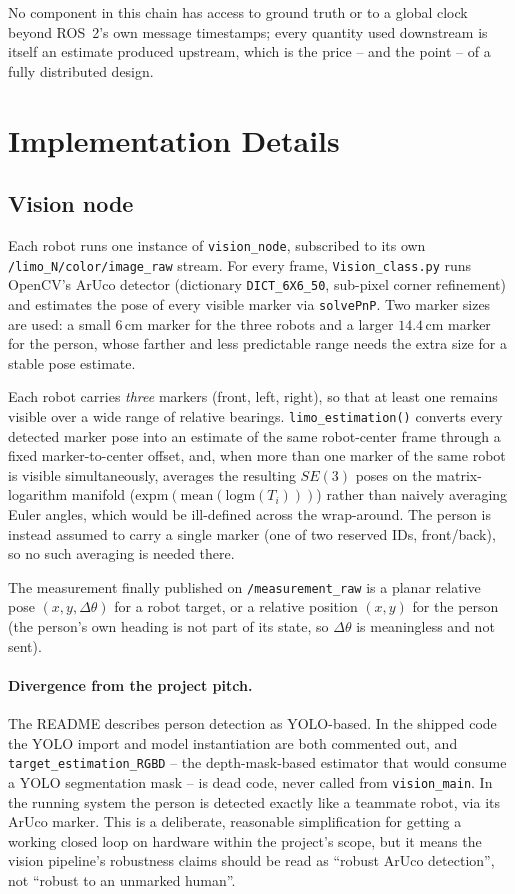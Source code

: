 \documentclass[10pt,conference]{IEEEtran}
\begin{document}
No component in this chain has access to ground truth or to a global clock beyond ROS~2's own
message timestamps; every quantity used downstream is itself an estimate produced upstream, which
is the price -- and the point -- of a fully distributed design.

\section{Implementation Details}

\subsection{Vision node}
\label{sec:vision-node}

Each robot runs one instance of \texttt{vision\_node}, subscribed to its own
\texttt{/limo\_\allowbreak N/color/image\_raw} stream. For every frame, \texttt{Vision\_class.py}
runs OpenCV's ArUco detector (dictionary \texttt{DICT\_6X6\_50}, sub-pixel corner refinement) and
estimates the pose of every visible marker via \texttt{solvePnP}. Two marker sizes are used: a
small $6\,\mathrm{cm}$ marker for the three robots and a larger $14.4\,\mathrm{cm}$ marker for the
person, whose farther and less predictable range needs the extra size for a stable pose estimate.

Each robot carries \emph{three} markers (front, left, right), so that at least one remains
visible over a wide range of relative bearings. \texttt{limo\_estimation()} converts every
detected marker pose into an estimate of the same robot-center frame through a fixed
marker-to-center offset, and, when more than one marker of the same robot is visible
simultaneously, averages the resulting $SE(3)$ poses on the matrix-logarithm manifold
($\mathrm{expm}(\mathrm{mean}(\mathrm{logm}(T_i)))$) rather than naively averaging Euler angles,
which would be ill-defined across the wrap-around. The person is instead assumed to carry a
single marker (one of two reserved IDs, front/back), so no such averaging is needed there.

The measurement finally published on \texttt{/measurement\_raw} is a planar relative pose
$(x,y,\Delta\theta)$ for a robot target, or a relative position $(x,y)$ for the person (the
person's own heading is not part of its state, so $\Delta\theta$ is meaningless and not sent).

\paragraph{Divergence from the project pitch.} The README describes person detection as
YOLO-based. In the shipped code the YOLO import and model instantiation are both commented out,
and \texttt{target\_estimation\_RGBD} -- the depth-mask-based estimator that would consume a YOLO
segmentation mask -- is dead code, never called from \texttt{vision\_main}. In the running system
the person is detected exactly like a teammate robot, via its ArUco marker. This is a deliberate,
reasonable simplification for getting a working closed loop on hardware within the project's
scope, but it means the vision pipeline's robustness claims should be read as ``robust ArUco
detection'', not ``robust to an unmarked human''.
\end{document}
